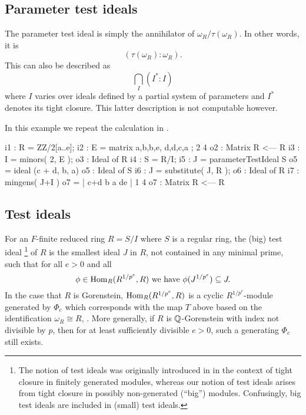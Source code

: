 \documentclass{amsart}
\begin{document}
\subsection{Parameter test ideals}

The parameter test ideal is simply the annihilator of $\omega_R/\tau(\omega_R)$.  In other words, it is
\[
( \tau(\omega_R) : \omega_R ).
\]
This can also be described as
\[
\bigcap_{I} (I^* : I)
\]
where $I$ varies over ideals defined by a partial system of parameters and $I^*$ denotes its tight closure.  This latter description is not computable however.

\begin{example}\label{Example: parameter test ideal}
In this example we repeat the calculation in \cite[\S 9]{KatzmanParameterTestIdealOfCMRings}.

\medskip
{\small
\begin{MyVerbatim}
i1 : R = ZZ/2[a..e];
i2 : E = matrix { {a,b,b,e}, {d,d,c,a} };
             2       4
o2 : Matrix R  <--- R
i3 : I = minors( 2, E );
o3 : Ideal of R
i4 : S = R/I;
i5 : J = parameterTestIdeal S
o5 = ideal (c + d, b, a)
o5 : Ideal of S
i6 : J = substitute( J, R );
o6 : Ideal of R
i7 : mingens( J+I )
o7 = | c+d b a de |
             1       4
o7 : Matrix R  <--- R
\end{MyVerbatim}
}\medskip

\end{example}

\subsection{Test ideals}

For an $F$-finite reduced ring $R = S/I$ where $S$ is a regular ring, the (big) test ideal
\footnote{The notion of test ideals was originally introduced in \cite{HochsterHunekeTC1} in the context of tight closure in finitely generated modules, whereas our notion of test ideals arises from
tight closure in possibly non-generated (``big'') modules. Confusingly, big test ideals are included in (small) test ideals.}
of $R$ is the smallest ideal $J$ in $R$, not contained in any minimal prime, such that for all $e > 0$ and all
\[
\phi \in \operatorname{Hom}_R(R^{1/p^e}, R) \text{ we have } \phi(J^{1/p^e}) \subseteq J.
\]
In the case that $R$ is Gorenstein,
$\operatorname{Hom}_R(R^{1/p^e}, R)$ is a cyclic $R^{1/p^e}$-module generated by
$\Phi_e$ which corresponds with the map $T$ above based on the identification
$\omega_R \cong R$, \cite{BlickleSchwedeSurveyPMinusE}.  More generally, if $R$ is $\mathbb{Q}$-Gorenstein with index not divisible by $p$, then for at least sufficiently divisible $e > 0$, such a generating $\Phi_e$ still exists.
\end{document}
